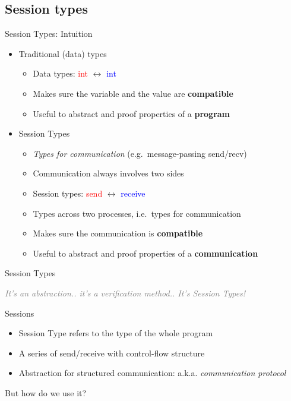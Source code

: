 \documentclass[xcolor={dvipsnames}]{beamer}
\begin{document}
\subsection{Session types}
\begin{frame}{Session Types: Intuition} %
  \begin{itemize}
    \item Traditional (data) types
      \begin{itemize}
        \item Data types: \textcolor{red}{int} $\longleftrightarrow$ \textcolor{blue}{int}
        \item Makes sure the variable and the value are \textbf{compatible}
        \item Useful to abstract and proof properties of a \textbf{program}
      \end{itemize}
    \item<2> Session Types
      \begin{itemize}
        \item \textit{Types for communication} (e.g.~message-passing send/recv)
        \item Communication always involves two sides
        \item Session types: \textcolor{red}{send} $\longleftrightarrow$ \textcolor{blue}{receive}
        \item Types across two processes, i.e.~types for communication
        \item Makes sure the communication is \textbf{compatible}
        \item Useful to abstract and proof properties of a \textbf{communication}
      \end{itemize}
  \end{itemize}
\end{frame}

\begin{frame}{Session Types}
  \begin{flushright}
    \textcolor{gray}{\textit{\scriptsize It's an abstraction.. it's a verification method.. It's Session Types!}}\\
  \end{flushright}
  Sessions
  \begin{itemize}
    \item Session Type refers to the type of the whole program
    \item A series of send/receive with control-flow structure
    \item Abstraction for structured communication: a.k.a. \textit{communication protocol}
  \end{itemize}
  But how do we use it?
\end{frame}
\end{document}
